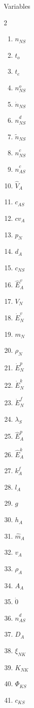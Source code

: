 \documentclass[10pt,a4paper]{report}
\begin{document}
	\Large{Variables}
	
	\begin{multicols}{2}
		\begin{enumerate}
			\item $n_{NS}$
			\item $t_o$
			\item $t_e$
			\item $n^{o}_{NS}$
			\item $\dot{n}_{NS}$
			\item $\hat{n}^{d}_{NS}$
			\item $\tilde{n}_{NS}$
			\item $\hat{n}^{c}_{NS}$
			\item $\hat{n}^{c}_{AS}$
			\item $\hat{V}_{A}$
			\item $c_{AS}$
			\item $cv_A$
			\item $p_N$
			\item $d_A$
			\item $c_{NS}$
			\item $\hat{E}^{v}_{A}$
			\item $V_N$
			\item $\dot{E}^{v}_N$
			\item $m_N$
			\item $\rho_N$
			\item $\dot{E}^{p}_N$
			\item $\dot{E}^{k}_N$
			\item $\dot{E}^{f}_N$
			\item $\lambda_S$
			\item $\hat{E}^{p}_{A}$
			\item $\hat{E}^{k}_{A}$
			\item $k^{f}_A$
			\item $l_A$
			\item $g$
			\item $h_A$
			\item $\hat{m}_A$
			\item $v_A$
			\item $\rho_A$
			\item $A_A$
			\item $\dot{0}$
			\item $\hat{n}^{d}_{AS}$
			\item $D_A$
			\item $\xi_{NK}$
			\item $K_{NK}$
			\item $\Phi_{KS}$
			\item $c_{KS}$

\end{enumerate}
\end{multicols}
\end{document}
